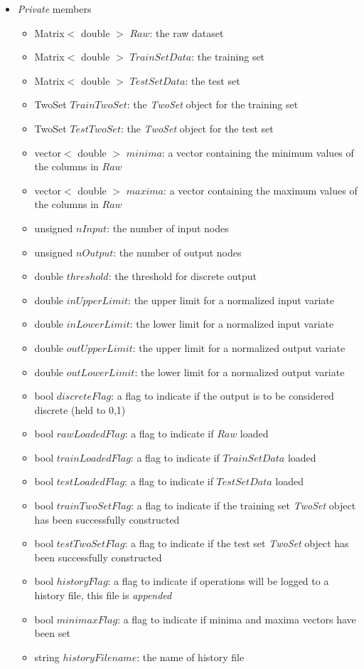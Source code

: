 \documentclass{report}
\begin{document}
\begin{itemize}
\begin{itemize}
\end{itemize}

\item {\em Private} members

\begin{itemize}
\item Matrix$<$ double $>$ $Raw$: the raw dataset
\item Matrix$<$ double $>$ $TrainSetData$: the training set
\item Matrix$<$ double $>$ $TestSetData$: the test set
\item TwoSet $TrainTwoSet$: the {\em TwoSet} object for the training
      set
\item TwoSet $TestTwoSet$: the {\em TwoSet} object for the test set
\item vector$<$ double $>$ $minima$: a vector containing the minimum
      values of the columns in $Raw$
\item vector$<$ double $>$ $maxima$: a vector containing the maximum
      values of the columns in $Raw$
\item unsigned $nInput$: the number of input nodes
\item unsigned $nOutput$: the number of output nodes
\item double $threshold$: the threshold for discrete output
\item double $inUpperLimit$: the upper limit for a normalized input
      variate
\item double $inLowerLimit$: the lower limit for a normalized input
      variate
\item double $outUpperLimit$: the upper limit for a normalized output
      variate
\item double $outLowerLimit$: the lower limit for a normalized output
      variate
\item bool $discreteFlag$: a flag to indicate if the output is to be
      considered discrete (held to 0,1)
\item bool $rawLoadedFlag$: a flag to indicate if $Raw$ loaded
\item bool $trainLoadedFlag$: a flag to indicate if $TrainSetData$
      loaded
\item bool $testLoadedFlag$: a flag to indicate if $TestSetData$
      loaded
\item bool $trainTwoSetFlag$: a flag to indicate if the training set
      {\em TwoSet} object has been successfully constructed
\item bool $testTwoSetFlag$: a flag to indicate if the test set {\em
      TwoSet} object has been successfully constructed
\item bool $historyFlag$: a flag to indicate if operations will be
      logged to a history file, this file is {\em appended}
\item bool $minimaxFlag$: a flag to indicate if minima and maxima
      vectors have been set
\item string $historyFilename$: the name of history file
\end{itemize}


\end{itemize}
\end{document}

